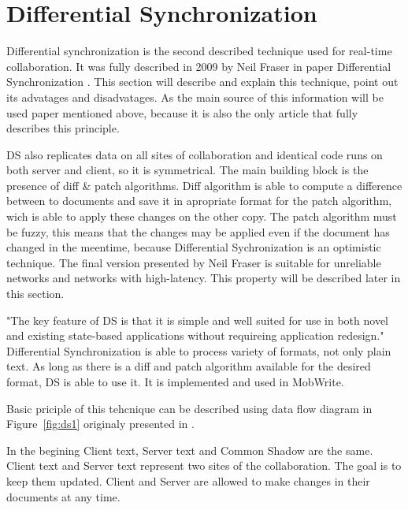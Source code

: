 \documentclass[12pt,oneside]{fithesis2}
\begin{document}
\section{Differential Synchronization}
\par Differential synchronization is the second described technique used for real-time collaboration. It was fully described in 2009 by Neil Fraser in paper Differential Synchronization \cite{Fraser}. This section will describe and explain this technique, point out its advatages and disadvatages. As the main source of this information will be used paper mentioned above, because it is also the only article that fully describes this principle.
\par DS also replicates data on all sites of collaboration and identical code runs on both server and client, so it is symmetrical. The main building block is the presence of diff \& patch algorithms. Diff algorithm is able to compute a difference between to documents and save it in apropriate format for the patch algorithm, wich is able to apply these changes on the other copy. The patch algorithm must be fuzzy, this means that the changes may be applied even if the document has changed in the meentime, because Differential Sychronization is an optimistic technique. The final version presented by Neil Fraser is suitable for unreliable networks and networks with high-latency. This property will be described later in this section.
\par "The key feature of DS is that it is simple and well suited for use in both novel and existing state-based applications without requireing application redesign." \cite{Fraser} Differential Synchronization is able to process variety of formats, not only plain text. As long as there is a diff and patch algorithm available for the desired format, DS is able to use it. It is implemented and used in MobWrite. 
\par Basic priciple of this tehcnique can be described using data flow diagram in Figure~\ref{fig:ds1} originaly presented in \cite{Fraser}.  
\par In the begining Client text, Server text and Common Shadow are the same. Client text and Server text represent two sites of the collaboration. The goal is to keep them updated. Client and Server are allowed to make changes in their documents at any time. 
\end{document}
